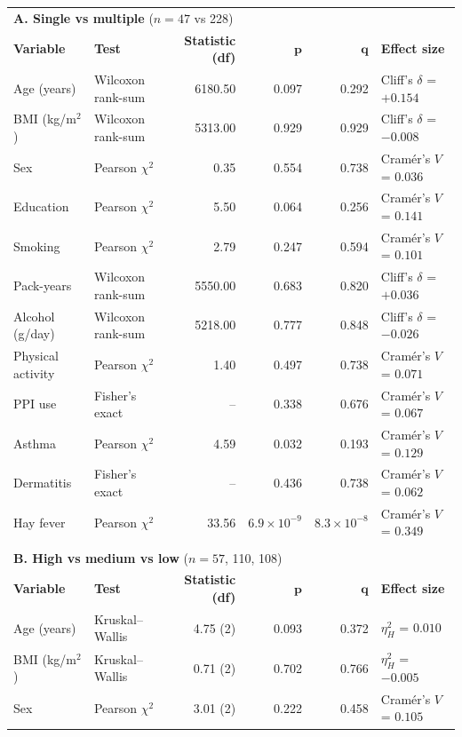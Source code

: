 \begin{table}[h!]
\centering
\small
\setlength{\tabcolsep}{4pt}
\begin{tabular}{l l r r r l}
\multicolumn{6}{l}{\textbf{A. Single vs multiple} ($n = 47$ vs 228)} \\
\textbf{Variable} & \textbf{Test} & \textbf{Statistic (df)} & $\boldsymbol{p}$ & $\boldsymbol{q}$ & \textbf{Effect size} \\
\hline
Age (years) & Wilcoxon rank-sum & 6180.50 & 0.097 & 0.292 & Cliff's $\delta$ = $+0.154$ \\
BMI (kg/m$^2$) & Wilcoxon rank-sum & 5313.00 & 0.929 & 0.929 & Cliff's $\delta$ = $-0.008$ \\
Sex & Pearson $\chi^2$ & 0.35 & 0.554 & 0.738 & Cram\'er's $V$ = $0.036$ \\
Education & Pearson $\chi^2$ & 5.50 & 0.064 & 0.256 & Cram\'er's $V$ = $0.141$ \\
Smoking & Pearson $\chi^2$ & 2.79 & 0.247 & 0.594 & Cram\'er's $V$ = $0.101$ \\
Pack-years & Wilcoxon rank-sum & 5550.00 & 0.683 & 0.820 & Cliff's $\delta$ = $+0.036$ \\
Alcohol (g/day) & Wilcoxon rank-sum & 5218.00 & 0.777 & 0.848 & Cliff's $\delta$ = $-0.026$ \\
Physical activity & Pearson $\chi^2$ & 1.40 & 0.497 & 0.738 & Cram\'er's $V$ = $0.071$ \\
PPI use & Fisher's exact & -- & 0.338 & 0.676 & Cram\'er's $V$ = $0.067$ \\
Asthma & Pearson $\chi^2$ & 4.59 & 0.032 & 0.193 & Cram\'er's $V$ = $0.129$ \\
Dermatitis & Fisher's exact & -- & 0.436 & 0.738 & Cram\'er's $V$ = $0.062$ \\
Hay fever & Pearson $\chi^2$ & 33.56 & $6.9\times10^{-9}$ & \textbf{$8.3\times10^{-8}$} & Cram\'er's $V$ = $0.349$ \\
\hline
\\
\multicolumn{6}{l}{\textbf{B. High vs medium vs low} ($n = 57$, 110, 108)} \\
\textbf{Variable} & \textbf{Test} & \textbf{Statistic (df)} & $\boldsymbol{p}$ & $\boldsymbol{q}$ & \textbf{Effect size} \\
\hline
Age (years) & Kruskal--Wallis & 4.75 (2) & 0.093 & 0.372 & $\eta^2_H$ = $0.010$ \\
BMI (kg/m$^2$) & Kruskal--Wallis & 0.71 (2) & 0.702 & 0.766 & $\eta^2_H$ = $-0.005$ \\
Sex & Pearson $\chi^2$ & 3.01 (2) & 0.222 & 0.458 & Cram\'er's $V$ = $0.105$ \\

\end{tabular}
\end{table}
